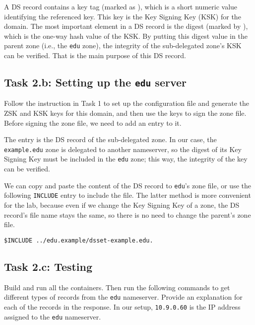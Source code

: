 A DS record contains a key tag (marked as ), which is a 
short numeric value identifying the referenced key. This key
is the Key Signing Key (KSK) for the domain.
The most important element in a DS record is the digest (marked by ),
which is the one-way hash value of the KSK. By putting this digest
value in the parent zone (i.e., the \texttt{edu} zone), 
the integrity of the sub-delegated zone's
KSK can be verified. That is the main purpose of this DS record. 



\subsection{Task 2.b: Setting up the \texttt{edu} server} 

Follow the instruction in Task 1 to set up the configuration 
file and generate the ZSK and KSK keys 
for this domain, and then use the keys to sign
the zone file. Before signing the zone file,
we need to add an entry to it.

The entry is the DS record of the sub-delegated zone. 
In our case, the \texttt{example.edu} zone is delegated to 
another nameserver, so the digest of its Key Signing Key must 
be included in the \texttt{edu} zone; this way, the 
integrity of the key can be verified. 


We can copy and paste the content of the DS record to 
\texttt{edu}'s zone file, or use the following
\texttt{INCLUDE} entry to include the file. The latter 
method is more convenient for the lab, because even if we 
change the Key Signing Key of a zone, the DS record's file name stays the same,
so there is no need to change the parent's zone file.

\begin{lstlisting}
$INCLUDE ../edu.example/dsset-example.edu.
\end{lstlisting}
 



\subsection{Task 2.c: Testing} 

Build and run all the containers. Then
run the following commands to get different types of records
from the \texttt{edu} nameserver. Provide an explanation
for each of the records in the response. 
In our setup, \texttt{10.9.0.60} is the IP address 
assigned to the \texttt{edu} nameserver.


